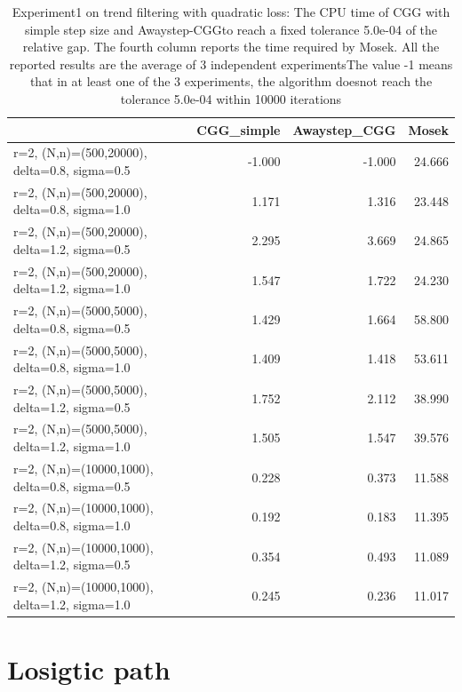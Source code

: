 \documentclass[english]{article}
\begin{document}
\begin{table}[H]
	\centering
	\label{Table_exp1}
	\begin{tabular}{lrrr}
		\toprule
		{} &  CGG\_simple &  Awaystep\_CGG &  Mosek \\
		\midrule
		r=2, (N,n)=(500,20000), delta=0.8, sigma=0.5  &      -1.000 &        -1.000 & 24.666 \\
		r=2, (N,n)=(500,20000), delta=0.8, sigma=1.0  &       1.171 &         1.316 & 23.448 \\
		r=2, (N,n)=(500,20000), delta=1.2, sigma=0.5  &       2.295 &         3.669 & 24.865 \\
		r=2, (N,n)=(500,20000), delta=1.2, sigma=1.0  &       1.547 &         1.722 & 24.230 \\
		r=2, (N,n)=(5000,5000), delta=0.8, sigma=0.5  &       1.429 &         1.664 & 58.800 \\
		r=2, (N,n)=(5000,5000), delta=0.8, sigma=1.0  &       1.409 &         1.418 & 53.611 \\
		r=2, (N,n)=(5000,5000), delta=1.2, sigma=0.5  &       1.752 &         2.112 & 38.990 \\
		r=2, (N,n)=(5000,5000), delta=1.2, sigma=1.0  &       1.505 &         1.547 & 39.576 \\
		r=2, (N,n)=(10000,1000), delta=0.8, sigma=0.5 &       0.228 &         0.373 & 11.588 \\
		r=2, (N,n)=(10000,1000), delta=0.8, sigma=1.0 &       0.192 &         0.183 & 11.395 \\
		r=2, (N,n)=(10000,1000), delta=1.2, sigma=0.5 &       0.354 &         0.493 & 11.089 \\
		r=2, (N,n)=(10000,1000), delta=1.2, sigma=1.0 &       0.245 &         0.236 & 11.017 \\
		\bottomrule
	\end{tabular}
	\caption{Experiment1 on trend filtering with quadratic loss: The CPU time of CGG with simple step size and Awaystep-CGGto reach a fixed tolerance 5.0e-04 of the relative gap. The fourth column reports the time required by Mosek. All the reported results are the average of 3 independent experimentsThe value -1 means that in at least one of the 3 experiments, the algorithm doesnot reach the tolerance 5.0e-04 within 10000 iterations}
\end{table}



\section{Losigtic path}
\end{document}
